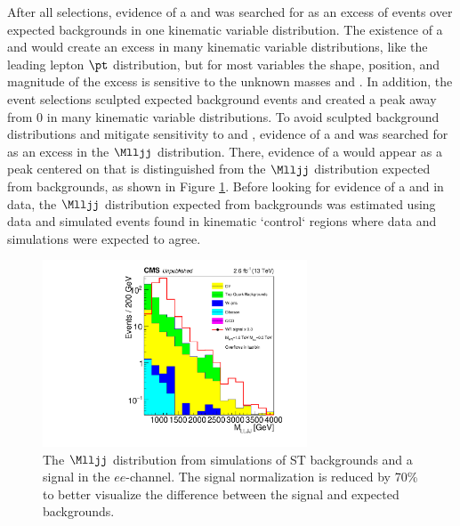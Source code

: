 After all selections, evidence of a \WR and \nul was searched for as an excess of events over expected backgrounds 
in one kinematic variable distribution.  The existence of a \WR and \nul would create an excess in many kinematic 
variable distributions, like the leading lepton $\pt$ distribution, but for most variables the shape, position, and 
magnitude of the excess is sensitive to the unknown masses \mWR and \mnul.  In addition, the event selections sculpted 
expected background events and created a peak away from $0$ in many kinematic variable distributions.  To avoid sculpted 
background distributions and mitigate sensitivity to \mWR and \mnul, evidence of a \WR and \nul was searched for as an 
excess in the $\Mlljj$ distribution.  There, evidence of a \WR would appear as a peak centered on \mWR 
that is distinguished from the $\Mlljj$ distribution expected from backgrounds, as shown in Figure \ref{fig:mlljjVariableOfMerit}.  
Before looking for evidence of a \WR and \nul in data, the $\Mlljj$ distribution expected from backgrounds was estimated 
using data and simulated events found in kinematic `control` regions where data and simulations were expected to agree.

\begin{figure}[h]
	\centering
	\includegraphics[width=0.7\textwidth]{figures/useOfLLJJMassAsFigureOfMerit.pdf}
	\caption{The $\Mlljj$ distribution from simulations of ST backgrounds and a \WR signal in the $ee$-channel.  
		The \WR signal normalization is reduced by 70\% to better visualize the difference 
	between the signal and expected backgrounds.}
	\label{fig:mlljjVariableOfMerit}
\end{figure}


